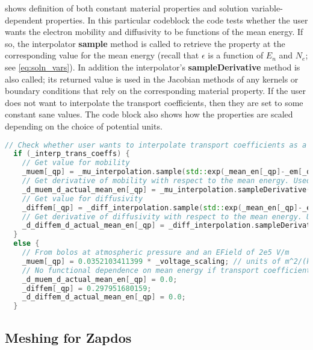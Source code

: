  shows definition of both constant material properties and solution variable-dependent properties. In this particular codeblock the code tests whether the user wants the electron mobility and diffusivity to be functions of the mean energy. If so, the interpolator \textbf{sample} method is called to retrieve the property at the corresponding value for the mean energy (recall that $\epsilon$ is a function of $E_n$ and $N_e$; see \cref{eq:soln_vars}). In addition the interpolator's \textbf{sampleDerivative} method is also called; its returned value is used in the Jacobian methods of any kernels or boundary conditions that rely on the corresponding material property. If the user does not want to interpolate the transport coefficients, then they are set to some constant sane values. The code block also shows how the properties are scaled depending on the choice of potential units.

\begin{lstlisting}[language=C++, caption = Material property definition, label = code:mat_def]
  // Check whether user wants to interpolate transport coefficients as a function of mean energy, or just use constants
  if (_interp_trans_coeffs) {
    // Get value for mobility
    _muem[_qp] = _mu_interpolation.sample(std::exp(_mean_en[_qp]-_em[_qp])) * _voltage_scaling;
    // Get derivative of mobility with respect to the mean energy. Used in Jacobian computations
    _d_muem_d_actual_mean_en[_qp] = _mu_interpolation.sampleDerivative(std::exp(_mean_en[_qp]-_em[_qp])) * _voltage_scaling;
    // Get value for diffusivity
    _diffem[_qp] = _diff_interpolation.sample(std::exp(_mean_en[_qp]-_em[_qp]));
    // Get derivative of diffusivity with respect to the mean energy. Used in Jacobian computations
    _d_diffem_d_actual_mean_en[_qp] = _diff_interpolation.sampleDerivative(std::exp(_mean_en[_qp]-_em[_qp]));
  }
  else {
    // From bolos at atmospheric pressure and an EField of 2e5 V/m
    _muem[_qp] = 0.0352103411399 * _voltage_scaling; // units of m^2/(kV*s) if _voltage_scaling = 1000
    // No functional dependence on mean energy if transport coefficients are constant
    _d_muem_d_actual_mean_en[_qp] = 0.0;
    _diffem[_qp] = 0.297951680159;
    _d_diffem_d_actual_mean_en[_qp] = 0.0;
  }
\end{lstlisting}


\subsection{Meshing for Zapdos}
\label{sec:zap_meshing}


